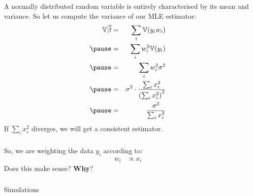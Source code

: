 \begin{frame}[fragile] \frametitle{}

A normally distributed random variable is entirely characterised
by its mean and variance. So let us compute the variance of our
MLE estimator:
\begin{eqnarray*}
\mathbb{V} \widehat{\beta} &=& \sum_i \mathbb{V} (y_i w_i) \\ \pause
&=& \sum_i w_i^2 \mathbb{V} (y_i) \\ \pause
&=& \sum_i w_i^2 \sigma^2 \\ \pause
&=& \sigma^2 \cdot \frac{\sum_i x_i^2}{\left(\sum_i x_i^2\right)^2}   \\ \pause
&=& \frac{\sigma^2}{\sum_i x_i^2}
\end{eqnarray*}
If $\sum_i x_i^2$ diverges, we will get a consistent estimator.

\end{frame}

\begin{frame}[fragile] \frametitle{}

So, we are weighting the data $y_i$ according to:
\begin{align*}
w_i &\propto x_i
\end{align*}
Does this make sense? {\bf Why}?

\end{frame}

\begin{frame}[fragile] \frametitle{}

\begin{flushright}
{\color{yaleblue}\sc\fontsize{1cm}{0cm}\selectfont Simulations}
\end{flushright}

\end{frame}

